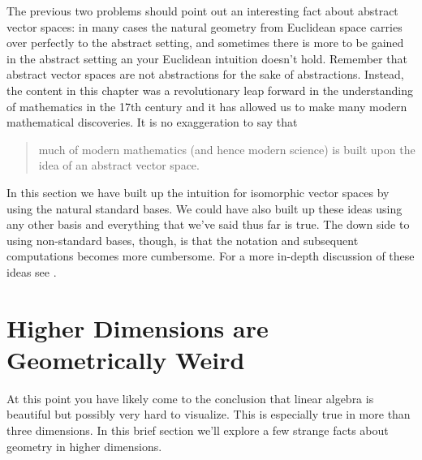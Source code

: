 The previous two problems should point out an interesting fact about abstract vector spaces: in
many cases the natural geometry from Euclidean space carries over perfectly to the
abstract setting, and sometimes there is more to be gained in the abstract setting an your
Euclidean intuition doesn't hold.  Remember that abstract vector spaces are not
abstractions for the sake of abstractions.  Instead, the content in this chapter was a
revolutionary leap forward in the understanding of mathematics in the 17th century and it
has allowed us to make many modern mathematical discoveries.  It is no exaggeration to say
that 
\begin{quote}
    much of modern mathematics (and hence modern science) is built upon the idea of an
    abstract vector space.
\end{quote}

In this section we have built up the intuition for isomorphic vector spaces by using the
natural standard bases.  We could have also built up these ideas using any other basis and
everything that we've said thus far is true.  The down side to using non-standard bases,
though, is that the notation and subsequent computations becomes more cumbersome.  For a
more in-depth discussion of these ideas see \cite{Lay}.

\newpage\section{Higher Dimensions are Geometrically Weird}
At this point you have likely come to the conclusion that linear algebra is beautiful but
possibly very hard to visualize.  This is especially true in more than three dimensions.
In this brief section we'll explore a few strange facts about geometry in higher
dimensions.

